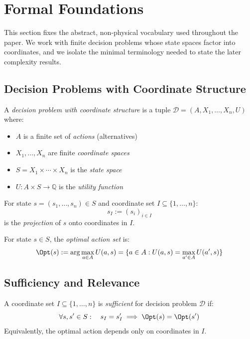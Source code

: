 \section{Formal Foundations}\label{sec:foundations}

This section fixes the abstract, non-physical vocabulary used throughout the paper. We work with finite decision problems whose state spaces factor into coordinates, and we isolate the minimal terminology needed to state the later complexity results.

\subsection{Decision Problems with Coordinate Structure}

\begin{definition}\label{def:decision-problem}
A \emph{decision problem with coordinate structure} is a tuple $\mathcal{D} = (A, X_1, \ldots, X_n, U)$ where:
\begin{itemize}
\item $A$ is a finite set of \emph{actions} (alternatives)
\item $X_1, \ldots, X_n$ are finite \emph{coordinate spaces}
\item $S = X_1 \times \cdots \times X_n$ is the \emph{state space}
\item $U : A \times S \to \mathbb{Q}$ is the \emph{utility function}
\end{itemize}
\end{definition}

\begin{definition}[Projection]\label{def:projection}
For state $s = (s_1, \ldots, s_n) \in S$ and coordinate set $I \subseteq \{1, \ldots, n\}$:
\[
s_I := (s_i)_{i \in I}
\]
is the \emph{projection} of $s$ onto coordinates in $I$.
\end{definition}

\begin{definition}\label{def:optimizer}
For state $s \in S$, the \emph{optimal action set} is:
\[
\Opt(s) := \arg\max_{a \in A} U(a, s) = \{a \in A : U(a,s) = \max_{a' \in A} U(a', s)\}
\]
\end{definition}

\subsection{Sufficiency and Relevance}

\begin{definition}\label{def:sufficient}
A coordinate set $I \subseteq \{1, \ldots, n\}$ is \emph{sufficient} for decision problem $\mathcal{D}$ if:
\[
\forall s, s' \in S: \quad s_I = s'_I \implies \Opt(s) = \Opt(s')
\]
Equivalently, the optimal action depends only on coordinates in $I$.
\end{definition}

